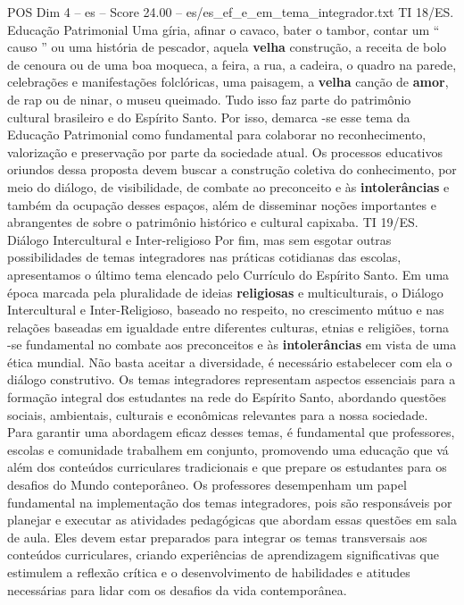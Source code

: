 \begin{textsample}{POS Dim 4 – es – Score 24.00 – es/es\_ef\_e\_em\_tema\_integrador.txt}
TI 18/ES.
Educação Patrimonial Uma gíria, afinar o cavaco, bater o tambor, contar um “ causo ” ou uma história de pescador, aquela \textbf{velha} construção, a receita de bolo de cenoura ou de uma boa moqueca, a feira, a rua, a cadeira, o quadro na parede, celebrações e manifestações folclóricas, uma paisagem, a \textbf{velha} canção de \textbf{amor}, de rap ou de ninar, o museu queimado.
Tudo isso faz parte do patrimônio cultural brasileiro e do Espírito Santo.
Por isso, demarca -se esse tema da Educação Patrimonial como fundamental para colaborar no reconhecimento, valorização e preservação por parte da sociedade atual.
Os processos educativos oriundos dessa proposta devem buscar a construção coletiva do conhecimento, por meio do diálogo, de visibilidade, de combate ao preconceito e às \textbf{intolerâncias} e também da ocupação desses espaços, além de disseminar noções importantes e abrangentes de sobre o patrimônio histórico e cultural capixaba.
TI 19/ES.
Diálogo Intercultural e Inter-religioso Por fim, mas sem esgotar outras possibilidades de temas integradores nas práticas cotidianas das escolas, apresentamos o último tema elencado pelo Currículo do Espírito Santo.
Em uma época marcada pela pluralidade de ideias \textbf{religiosas} e multiculturais, o Diálogo Intercultural e Inter-Religioso, baseado no respeito, no crescimento mútuo e nas relações baseadas em igualdade entre diferentes culturas, etnias e religiões, torna -se fundamental no combate aos preconceitos e às \textbf{intolerâncias} em vista de uma ética mundial.
Não basta aceitar a diversidade, é necessário estabelecer com ela o diálogo construtivo.
Os temas integradores representam aspectos essenciais para a formação integral dos estudantes na rede do Espírito Santo, abordando questões sociais, ambientais, culturais e econômicas relevantes para a nossa sociedade.
Para garantir uma abordagem eficaz desses temas, é fundamental que professores, escolas e comunidade trabalhem em conjunto, promovendo uma educação que vá além dos conteúdos curriculares tradicionais e que prepare os estudantes para os desafios do Mundo conteporâneo.
Os professores desempenham um papel fundamental na implementação dos temas integradores, pois são responsáveis por planejar e executar as atividades pedagógicas que abordam essas questões em sala de aula.
Eles devem estar preparados para integrar os temas transversais aos conteúdos curriculares, criando experiências de aprendizagem significativas que estimulem a reflexão crítica e o desenvolvimento de habilidades e atitudes necessárias para lidar com os desafios da vida contemporânea.

\end{textsample}
